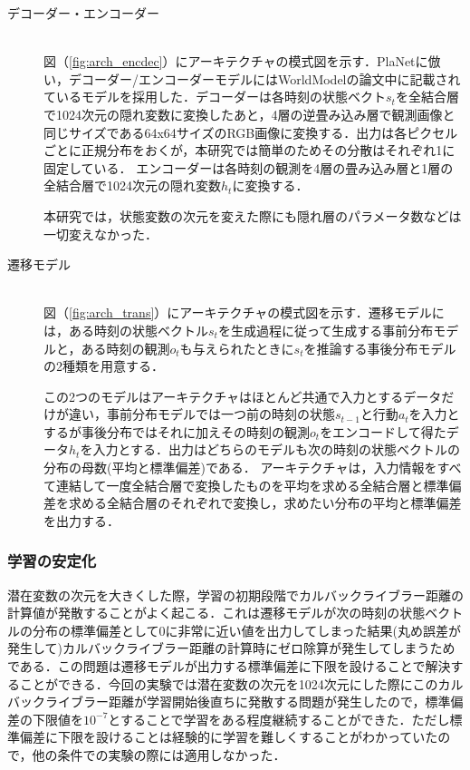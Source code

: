 \begin{description}

    \item[デコーダー・エンコーダー]\mbox{}\\

図（\ref{fig:arch_encdec}）にアーキテクチャの模式図を示す．PlaNetに倣い，デコーダー/エンコーダーモデルにはWorldModel\cite{ha1803world}の論文中に記載されているモデルを採用した．デコーダーは各時刻の状態ベクト$s_t$を全結合層で1024次元の隠れ変数に変換したあと，4層の逆畳み込み層で観測画像と同じサイズである64x64サイズのRGB画像に変換する．出力は各ピクセルごとに正規分布をおくが，本研究では簡単のためその分散はそれぞれ1に固定している．
エンコーダーは各時刻の観測を4層の畳み込み層と1層の全結合層で1024次元の隠れ変数$h_t$に変換する．

本研究では，状態変数の次元を変えた際にも隠れ層のパラメータ数などは一切変えなかった．

    \item[遷移モデル]\mbox{}\\
図（\ref{fig:arch_trans}）にアーキテクチャの模式図を示す．遷移モデルには，ある時刻の状態ベクトル$s_t$を生成過程に従って生成する事前分布モデルと，ある時刻の観測$o_t$も与えられたときに$s_t$を推論する事後分布モデルの2種類を用意する．

この2つのモデルはアーキテクチャはほとんど共通で入力とするデータだけが違い，事前分布モデルでは一つ前の時刻の状態$s_{t-1}$と行動$a_t$を入力とするが事後分布ではそれに加えその時刻の観測$o_t$をエンコードして得たデータ$h_t$を入力とする．出力はどちらのモデルも次の時刻の状態ベクトルの分布の母数(平均と標準偏差)である．
アーキテクチャは，入力情報をすべて連結して一度全結合層で変換したものを平均を求める全結合層と標準偏差を求める全結合層のそれぞれで変換し，求めたい分布の平均と標準偏差を出力する．

\end{description}

\subsubsection{学習の安定化}
潜在変数の次元を大きくした際，学習の初期段階でカルバックライブラー距離の計算値が発散することがよく起こる．これは遷移モデルが次の時刻の状態ベクトルの分布の標準偏差として0に非常に近い値を出力してしまった結果(丸め誤差が発生して)カルバックライブラー距離の計算時にゼロ除算が発生してしまうためである．この問題は遷移モデルが出力する標準偏差に下限を設けることで解決することができる．今回の実験では潜在変数の次元を1024次元にした際にこのカルバックライブラー距離が学習開始後直ちに発散する問題が発生したので，標準偏差の下限値を$10^{-7}$とすることで学習をある程度継続することができた．ただし標準偏差に下限を設けることは経験的に学習を難しくすることがわかっていたので，他の条件での実験の際には適用しなかった．

